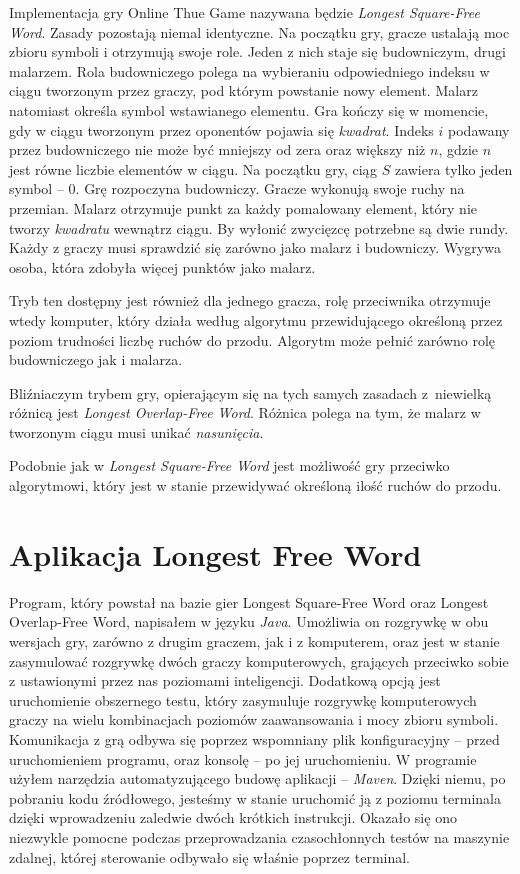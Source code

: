 \documentclass[document]{xmgr}
\begin{document}
Implementacja gry Online Thue Game nazywana będzie \emph{Longest Squa\-re-Free Word}.
Zasady pozostają niemal identyczne. Na początku gry, gracze ustalają moc zbioru symboli i otrzymują swoje role. Jeden z nich staje się budowniczym, drugi malarzem. Rola budowniczego polega na wybieraniu odpowiedniego indeksu w ciągu tworzonym przez graczy, pod którym powstanie nowy element. Malarz natomiast określa symbol wstawianego elementu. Gra kończy się w momencie, gdy w ciągu tworzonym przez oponentów pojawia się \emph{kwadrat}. Indeks $i$  podawany przez budowniczego nie może być mniejszy od zera oraz większy niż $n$, gdzie $n$ jest równe liczbie elementów w ciągu. Na początku gry, ciąg $S$ zawiera tylko jeden symbol -- $0$.
Grę rozpoczyna budowniczy. Gracze wykonują swoje ruchy na przemian. Malarz otrzymuje punkt za każdy pomalowany element, który nie tworzy \emph{kwadratu} wewnątrz ciągu.
By wyłonić zwycięzcę potrzebne są dwie rundy. Każdy z graczy musi sprawdzić się zarówno jako malarz i budowniczy. Wygrywa osoba, która zdobyła więcej punktów jako malarz.

Tryb ten dostępny jest również dla jednego gracza, rolę przeciwnika otrzymuje wtedy komputer, który działa według algorytmu przewidującego określoną przez poziom trudności liczbę ruchów do przodu. Algorytm może pełnić zarówno rolę budowniczego jak i malarza.

Bliźniaczym trybem gry, opierającym się na tych samych zasadach z~niewielką różnicą jest \emph{Longest Overlap-Free Word}. 
Różnica polega na tym, że malarz w tworzonym ciągu musi unikać \emph{nasunięcia}.

Podobnie jak w \emph{Longest Square-Free Word} jest możliwość gry przeciwko algorytmowi, który jest w stanie przewidywać określoną ilość ruchów do przodu.

\chapter{Aplikacja Longest Free Word}
Program, który powstał na bazie gier Longest Square-Free Word oraz Longest Overlap-Free Word, napisałem w języku \textit{Java}. Umożliwia on rozgrywkę w obu wersjach gry, zarówno z drugim graczem, jak i z komputerem, oraz jest w stanie zasymulować rozgrywkę dwóch graczy komputerowych, grających przeciwko sobie z ustawionymi przez nas poziomami inteligencji. Dodatkową opcją jest uruchomienie obszernego testu, który zasymuluje rozgrywkę komputerowych graczy na wielu kombinacjach poziomów zaawansowania i mocy zbioru symboli. Komunikacja z grą odbywa się poprzez wspomniany plik konfiguracyjny -- przed uruchomieniem programu, oraz konsolę -- po jej uruchomieniu. W programie użyłem narzędzia automatyzującego budowę aplikacji -- \textit{Maven}. Dzięki niemu, po pobraniu kodu źródłowego, jesteśmy w stanie uruchomić ją z poziomu terminala dzięki wprowadzeniu zaledwie dwóch krótkich instrukcji. Okazało się ono niezwykle pomocne podczas przeprowadzania czasochłonnych testów na maszynie zdalnej, której sterowanie odbywało się właśnie poprzez terminal.
\end{document}
